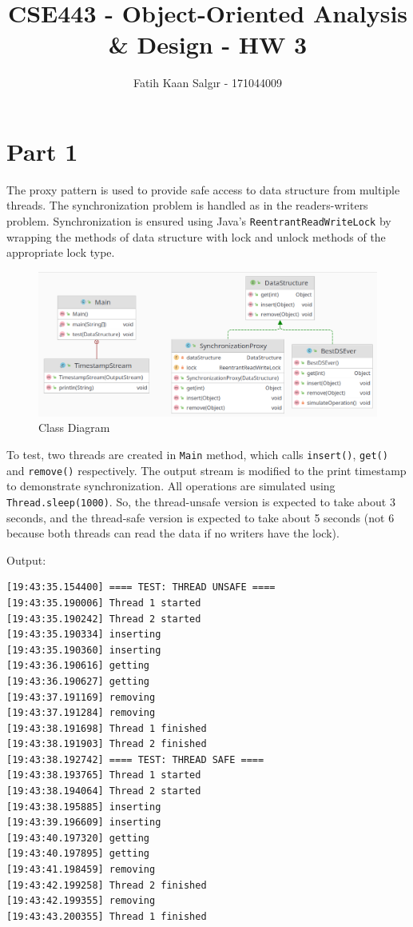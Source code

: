 \documentclass[a4paper]{article}
\author{Fatih Kaan Salgır - 171044009}
\date{}
\title{CSE443 - Object-Oriented Analysis \& Design - HW 3}
\begin{document}
\maketitle

\section*{Part 1}
\label{sec:orgac057b0}

The proxy pattern is used to provide safe access to data structure from multiple threads.
The synchronization problem is handled as in the readers-writers problem.
Synchronization is ensured using Java's \texttt{ReentrantReadWriteLock} by wrapping the methods of data structure with lock and unlock methods of the appropriate lock type.



\begin{figure}[htbp]
\centering
\includegraphics[width=.9\linewidth]{org-img/Part_1/2021-12-12_19-49-36_screenshot.png}
\caption{Class Diagram}
\end{figure}


To test, two threads are created in \texttt{Main} method, which calls \texttt{insert()}, \texttt{get()} and \texttt{remove()} respectively.
The output stream is modified to the print timestamp to demonstrate synchronization.
All operations are simulated using \texttt{Thread.sleep(1000)}.
So, the thread-unsafe version is expected to take about 3 seconds, and the thread-safe version is expected to take about 5 seconds (not 6 because both threads can read the data if no writers have the lock).


Output:

\begin{verbatim}
[19:43:35.154400] ==== TEST: THREAD UNSAFE ====
[19:43:35.190006] Thread 1 started
[19:43:35.190242] Thread 2 started
[19:43:35.190334] inserting
[19:43:35.190360] inserting
[19:43:36.190616] getting
[19:43:36.190627] getting
[19:43:37.191169] removing
[19:43:37.191284] removing
[19:43:38.191698] Thread 1 finished
[19:43:38.191903] Thread 2 finished
[19:43:38.192742] ==== TEST: THREAD SAFE ====
[19:43:38.193765] Thread 1 started
[19:43:38.194064] Thread 2 started
[19:43:38.195885] inserting
[19:43:39.196609] inserting
[19:43:40.197320] getting
[19:43:40.197895] getting
[19:43:41.198459] removing
[19:43:42.199258] Thread 2 finished
[19:43:42.199355] removing
[19:43:43.200355] Thread 1 finished
\end{verbatim}
\end{document}
